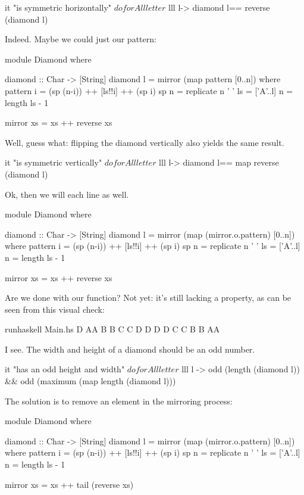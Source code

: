 \begin{hspec}
it "is symmetric horizontally" $ do
    forAll letter $ lll l->
        diamond l== reverse (diamond l)
\end{hspec}
\answer Indeed. Maybe we could just  our pattern:
\begin{haskell}[frame=single]
module Diamond
where

diamond :: Char -> [String]
diamond l = mirror (map pattern [0..n])
    where 
    pattern i = (sp (n-i)) ++ [ls!!i] ++ (sp i)
    sp n = replicate n ' '
    ls = ['A'..l]
    n = length ls - 1

    mirror xs = xs ++ reverse xs
\end{haskell}
\askN Well, guess what: flipping the diamond vertically also yields the same result.
\begin{hspec}
it "is symmetric vertically" $ do
forAll letter $ lll l->
    diamond l== map reverse (diamond l)
\end{hspec}
\answer Ok, then we will  each line as well. 
\begin{haskell}[frame=single]
module Diamond
where

diamond :: Char -> [String]
diamond l = mirror (map (mirror.o.pattern) [0..n])
    where 
    pattern i = (sp (n-i)) ++ [ls!!i] ++ (sp i)
    sp n = replicate n ' '
    ls = ['A'..l]
    n = length ls - 1

    mirror xs = xs ++ reverse xs
\end{haskell}
\askN Are we done with our  function? 
\answer Not yet: it's still lacking a property, as can be seen from this visual check: 
\begin{term}
runhaskell Main.hs D\rk
   AA
  B  B
 C    C
D      D
D      D
 C    C
  B  B
   AA
\end{term}
\askN I see. The width and height of a diamond should be an odd number. 
\begin{hspec}
it "has an odd height and width" $ do
forAll letter $ lll l ->
    odd (length (diamond l))  
    && odd (maximum (map length (diamond l)))
\end{hspec}
\answer The solution is to remove an element in the mirroring process: 
\begin{haskell}[frame=single]
module Diamond
where

diamond :: Char -> [String]
diamond l = mirror (map (mirror.o.pattern) [0..n])
    where 
    pattern i = (sp (n-i)) ++ [ls!!i] ++ (sp i)
    sp n = replicate n ' '
    ls = ['A'..l]
    n = length ls - 1

    mirror xs = xs ++ tail (reverse xs)
\end{haskell}
